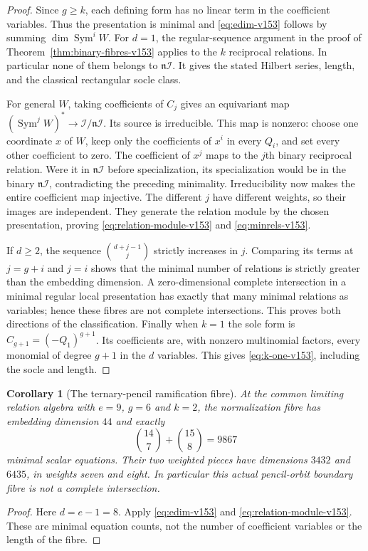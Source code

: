\documentclass[11pt,reqno]{amsart}
\numberwithin{equation}{section}
\newtheorem{corollary}[theorem]{Corollary}
\theoremstyle{definition}\newtheorem{definition}[theorem]{Definition}
\theoremstyle{remark}\newtheorem{remark}[theorem]{Remark}
\DeclareMathOperator{\Sym}{Sym}\DeclareMathOperator{\Gr}{Gr}
\begin{document}
\begin{proof}
Since $g\geq k$, each defining form has no linear term in the
coefficient variables. Thus the presentation is minimal and
\eqref{eq:edim-v153} follows by summing $\dim\Sym^iW$.
For $d=1$, the regular-sequence argument in the proof of
Theorem~\ref{thm:binary-fibres-v153} applies to the $k$ reciprocal
relations. In particular none of them belongs to $\mathfrak n\mathcal I$.
It gives the stated Hilbert series, length, and the classical rectangular
socle class.

For general $W$, taking coefficients of $C_j$ gives an equivariant
map $(\Sym^jW)^*\to\mathcal I/\mathfrak n\mathcal I$.
Its source is irreducible. This map is nonzero: choose one coordinate
$x$ of $W$, keep only the coefficients of $x^i$ in every $Q_i$, and
set every other coefficient to zero. The coefficient of $x^j$ maps
to the $j$th binary reciprocal relation. Were it in
$\mathfrak n\mathcal I$ before specialization, its specialization
would be in the binary $\mathfrak n\mathcal I$, contradicting the
preceding minimality. Irreducibility now makes the entire coefficient
map injective. The different $j$ have different weights, so their
images are independent. They generate the relation module by the
chosen presentation, proving \eqref{eq:relation-module-v153} and
\eqref{eq:minrels-v153}.

If $d\geq2$, the sequence $\binom{d+j-1}{j}$ strictly increases in
$j$. Comparing its terms at $j=g+i$ and $j=i$ shows that the minimal
number of relations is strictly greater than the embedding dimension.
A zero-dimensional complete intersection in a minimal regular local
presentation has exactly that many minimal relations as variables;
hence these fibres are not complete intersections. This proves both
directions of the classification. Finally when $k=1$ the sole form
is $C_{g+1}=(-Q_1)^{g+1}$. Its coefficients are, with nonzero multinomial
factors, every monomial of degree $g+1$ in the $d$ variables. This gives
\eqref{eq:k-one-v153}, including the socle and length.
\end{proof}

\begin{corollary}[The ternary-pencil ramification fibre]
\label{cor:ternary-fibre-v153}
At the common limiting relation algebra with $e=9$, $g=6$ and $k=2$,
the normalization fibre has embedding dimension $44$ and exactly
\[
 \binom{14}{7}+\binom{15}{8}=9867
\]
minimal scalar equations. Their two weighted pieces have dimensions
$3432$ and $6435$, in weights seven and eight. In particular this
actual pencil-orbit boundary fibre is not a complete intersection.
\end{corollary}
\begin{proof}
Here $d=e-1=8$. Apply \eqref{eq:edim-v153} and
\eqref{eq:relation-module-v153}. These are minimal equation counts,
not the number of coefficient variables or the length of the fibre.
\end{proof}
\end{document}
